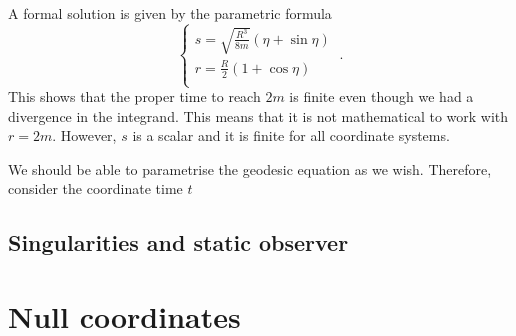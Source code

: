     A formal solution is given by the parametric formula
    \begin{equation*}
        \begin{cases}
            s = \sqrt{\frac{R^3}{8m}} (\eta + \sin \eta) \\
            r = \frac{R}{2} (1 + \cos \eta) \\
        \end{cases} ~.
    \end{equation*}
    This shows that the proper time to reach $2m$ is finite even though we had a divergence in the integrand. This means that it is not mathematical to work with $r = 2m$. However, $s$ is a scalar and it is finite for all coordinate systems. 

    We should be able to parametrise the geodesic equation as we wish. Therefore, consider the coordinate time $t$ 

\section{Singularities and static observer}

\chapter{Null coordinates}
